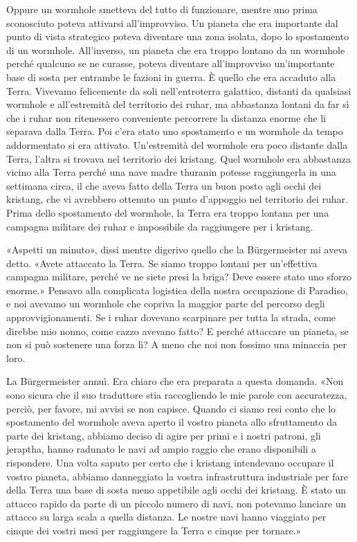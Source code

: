 Oppure un wormhole smetteva del tutto di funzionare, mentre uno prima
sconosciuto poteva attivarsi all'improvviso. Un pianeta che era
importante dal punto di vista strategico poteva diventare una zona
isolata, dopo lo spostamento di un wormhole. All'inverso, un pianeta che
era troppo lontano da un wormhole perché qualcuno se ne curasse, poteva
diventare all'improvviso un'importante base di sosta per entrambe le
fazioni in guerra. È quello che era accaduto alla Terra. Vivevamo
felicemente da soli nell'entroterra galattico, distanti da qualsiasi
wormhole e all'estremità del territorio dei ruhar, ma abbastanza lontani
da far sì che i ruhar non ritenessero conveniente percorrere la distanza
enorme che li separava dalla Terra. Poi c'era stato uno spostamento e un
wormhole da tempo addormentato si era attivato. Un'estremità del
wormhole era poco distante dalla Terra, l'altra si trovava nel
territorio dei kristang. Quel wormhole era abbastanza vicino alla Terra
perché una nave madre thuranin potesse raggiungerla in una settimana
circa, il che aveva fatto della Terra un buon posto agli occhi dei
kristang, che vi avrebbero ottenuto un punto d'appoggio nel territorio
dei ruhar. Prima dello spostamento del wormhole, la Terra era troppo
lontana per una campagna militare dei ruhar e impossibile da raggiungere
per i kristang.

«Aspetti un minuto», dissi mentre digerivo quello che la Bürgermeister
mi aveva detto. «Avete attaccato la Terra. Se siamo troppo lontani per
un'effettiva campagna militare, perché ve ne siete presi la briga? Deve
essere stato uno sforzo enorme.» Pensavo alla complicata logistica della
nostra occupazione di Paradiso, e noi avevamo un wormhole che copriva la
maggior parte del percorso degli approvvigionamenti. Se i ruhar dovevano
scarpinare per tutta la strada, come direbbe mio nonno, come cazzo
avevano fatto? E perché attaccare un pianeta, se non si può sostenere
una forza lì? A meno che noi non fossimo una minaccia per loro.

La Bürgermeister annuì. Era chiaro che era preparata a questa domanda.
«Non sono sicura che il suo traduttore stia raccogliendo le mie parole
con accuratezza, perciò, per favore, mi avvisi se non capisce. Quando ci
siamo resi conto che lo spostamento del wormhole aveva aperto il vostro
pianeta allo sfruttamento da parte dei kristang, abbiamo deciso di agire
per primi e i nostri patroni, gli jeraptha, hanno radunato le navi ad
ampio raggio che erano disponibili a rispondere. Una volta saputo per
certo che i kristang intendevano occupare il vostro pianeta, abbiamo
danneggiato la vostra infrastruttura industriale per fare della Terra
una base di sosta meno appetibile agli occhi dei kristang. È stato un
attacco rapido da parte di un piccolo numero di navi, non potevamo
lanciare un attacco su larga scala a quella distanza. Le nostre navi
hanno viaggiato per cinque dei vostri mesi per raggiungere la Terra e
cinque per tornare.»

